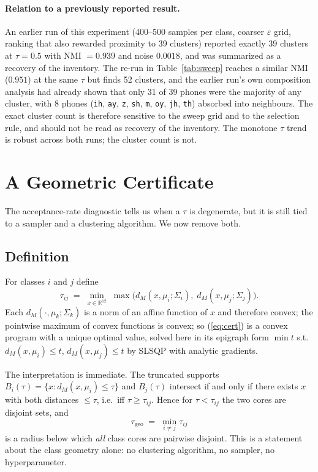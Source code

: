 \documentclass[11pt]{article}
\newcommand{\ph}[1]{\texttt{#1}}
\newcommand{\tgeo}{\tau_{\mathrm{geo}}}
\begin{document}
\paragraph{Relation to a previously reported result.} An earlier run of this
experiment (400--500 samples per class, coarser $\varepsilon$ grid, ranking that
also rewarded proximity to 39 clusters) reported exactly 39 clusters at
$\tau=0.5$ with NMI $=0.939$ and noise $0.0018$, and was summarized as a
recovery of the inventory. The re-run in Table~\ref{tab:sweep} reaches a similar
NMI ($0.951$) at the same $\tau$ but finds 52 clusters, and the earlier run's own
composition analysis had already shown that only 31 of 39 phones were the
majority of any cluster, with 8 phones (\ph{ih}, \ph{ay}, \ph{z}, \ph{sh},
\ph{m}, \ph{oy}, \ph{jh}, \ph{th}) absorbed into neighbours. The exact cluster
count is therefore sensitive to the sweep grid and to the selection rule, and
should not be read as recovery of the inventory. The monotone $\tau$ trend is
robust across both runs; the cluster count is not.

\section{A Geometric Certificate}
\label{sec:cert}

The acceptance-rate diagnostic tells us when a $\tau$ is degenerate, but it is
still tied to a sampler and a clustering algorithm. We now remove both.

\subsection{Definition}

For classes $i$ and $j$ define
\begin{equation}
\tau_{ij} \;=\; \min_{x \in \mathbb{R}^{12}}\;
\max\big(d_M(x,\mu_i;\Sigma_i),\; d_M(x,\mu_j;\Sigma_j)\big).
\label{eq:cert}
\end{equation}
Each $d_M(\cdot,\mu_k;\Sigma_k)$ is a norm of an affine function of $x$ and
therefore convex; the pointwise maximum of convex functions is convex; so
(\ref{eq:cert}) is a convex program with a unique optimal value, solved here in
its epigraph form $\min t$ s.t.\ $d_M(x,\mu_i) \le t$, $d_M(x,\mu_j)\le t$ by
SLSQP with analytic gradients.

The interpretation is immediate. The truncated supports
$B_i(\tau) = \{x : d_M(x,\mu_i) \le \tau\}$ and $B_j(\tau)$ intersect if and
only if there exists $x$ with both distances $\le \tau$, i.e.\ iff
$\tau \ge \tau_{ij}$. Hence for $\tau < \tau_{ij}$ the two cores are disjoint
sets, and
\[
\tgeo \;=\; \min_{i \ne j} \tau_{ij}
\]
is a radius below which \emph{all} class cores are pairwise disjoint. This is a
statement about the class geometry alone: no clustering algorithm, no sampler,
no hyperparameter.
\end{document}
